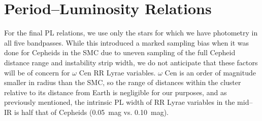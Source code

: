 \documentclass[a4paper,fleqn,usenatbib]{mnras}
\begin{document}
\section{Period--Luminosity Relations}
\label{sec:pl_relation}





For the final PL relations, we use only the stars for which we have photometry in all five bandpasses. While this introduced a marked sampling bias when it was done for Cepheids in the SMC \citep{2015arXiv150206995S} due to uneven sampling of the full Cepheid distance range and instability strip width, we do not anticipate that these factors will be of concern for $\omega$ Cen RR Lyrae variables. $\omega$ Cen is an order of magnitude smaller in radius than the SMC, so the range of distances within the cluster relative to its distance from Earth is negligible for our purposes, and as previously mentioned, the intrinsic PL width of RR Lyrae variables in the mid--IR is half that of Cepheids (0.05~mag vs. 0.10~mag).
\end{document}
